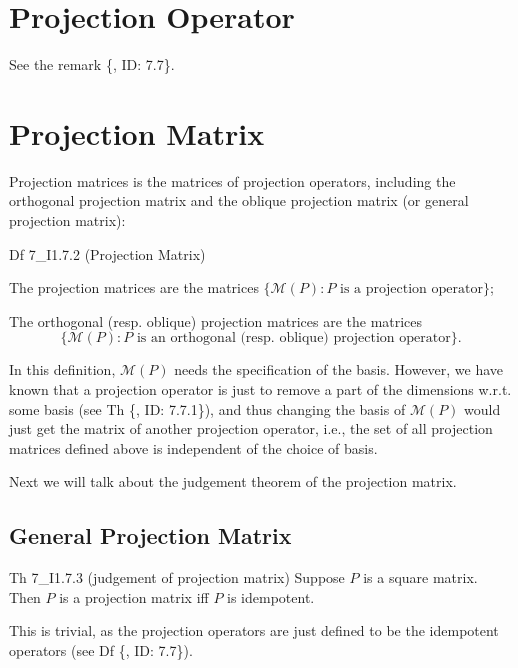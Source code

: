\documentclass{article}
\begin{document}
\section{Projection Operator}
See the remark \{, ID: 7.7\}.

\section{Projection Matrix}
\textcolor{Df}{Projection matrices is the matrices of projection operators, including the orthogonal projection matrix and the oblique projection matrix (or general projection matrix):}
\begin{Df}{Df 7\_I1.7.2 (Projection Matrix)}
    \begin{compactenum}
        \item The projection matrices are the matrices $\{\mathcal{M}(P): P\text{ is a projection operator}\}$;
        \item The orthogonal (resp. oblique) projection matrices are the matrices
        $$\{\mathcal{M}(P): P\text{ is an orthogonal (resp. oblique) projection operator}\}.$$
    \end{compactenum}
\end{Df}

In this definition, $\mathcal{M}(P)$ needs the specification of the basis. However, we have known that a projection operator is just to remove a part of the dimensions w.r.t. some basis (see Th \{, ID: 7.7.1\}), and thus changing the basis of $\mathcal{M}(P)$ would just get the matrix of another projection operator, i.e., the set of all projection matrices defined above is independent of the choice of basis.

Next we will talk about the judgement theorem of the projection matrix.

\subsection{General Projection Matrix}
\begin{Th}{Th 7\_I1.7.3 (judgement of projection matrix)}
    Suppose $P$ is a square matrix. Then $P$ is a projection matrix iff $P$ is idempotent.
\end{Th}
This is trivial, as the projection operators are just defined to be the idempotent operators (see Df \{, ID: 7.7\}).
\end{document}
